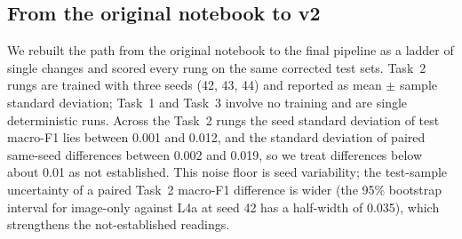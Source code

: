 
\subsection{From the original notebook to v2}
\label{sec:ablation-ladder}

We rebuilt the path from the original notebook to the final pipeline as a ladder of single changes and scored every rung on the same corrected test sets.
Task~2 rungs are trained with three seeds (42, 43, 44) and reported as mean $\pm$ sample standard deviation; Task~1 and Task~3 involve no training and are single deterministic runs.
Across the Task~2 rungs the seed standard deviation of test macro-F1 lies between 0.001 and 0.012, and the standard deviation of paired same-seed differences between 0.002 and 0.019, so we treat differences below about 0.01 as not established.
This noise floor is seed variability; the test-sample uncertainty of a paired Task~2 macro-F1 difference is wider (the 95\% bootstrap interval for image-only against L4a at seed 42 has a half-width of 0.035), which strengthens the not-established readings.

